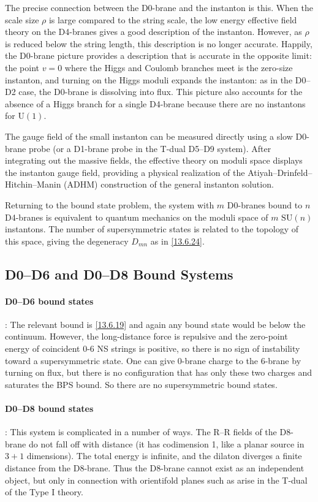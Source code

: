 The precise connection between the D0-brane and the instanton is this. When the scale size $\rho$ is large compared to the string scale, the low energy effective field theory on the D4-branes gives a good description of the instanton. However, as $\rho$ is reduced below the string length, this description is no longer accurate. Happily, the D0-brane picture provides a description that is accurate in the opposite limit: the point $v = 0$ where the Higgs and Coulomb branches meet is the zero-size instanton, and turning on the Higgs moduli expands the instanton: as in the D0--D2 case, the D0-brane is dissolving into flux. This picture also accounts for the absence of a Higgs branch for a single D4-brane because there are no instantons for $\mathrm{U}(1)$.

The gauge field of the small instanton can be measured directly using a slow D0-brane probe (or a D1-brane probe in the T-dual D5--D9 system). After integrating out the massive fields, the effective theory on moduli space displays the instanton gauge field, providing a physical realization of the Atiyah--Drinfeld--Hitchin--Manin (ADHM) construction of the general instanton solution.

Returning to the bound state problem, the system with $m$ D0-branes bound to $n$ D4-branes is equivalent to quantum mechanics on the moduli space of $m$ $\mathrm{SU}(n)$ instantons. The number of supersymmetric states is related to the topology of this space, giving the degeneracy $D_{mn}$ as in \eqref{13.6.24}.

\subsection*{D0--D6 and D0--D8 Bound Systems}

\paragraph*{D0--D6 bound states}:
The relevant bound is \eqref{13.6.19} and again any bound state would be below the continuum. However, the long-distance force is repulsive and the zero-point energy of coincident 0-6 NS strings is positive, so there is no sign of instability toward a supersymmetric state. One can give 0-brane charge to the 6-brane by turning on flux, but there is no configuration that has only these two charges and saturates the BPS bound. So there are no supersymmetric bound states.

\paragraph*{D0--D8 bound states}:
This system is complicated in a number of ways. The R--R fields of the D8-brane do not fall off with distance (it has codimension 1, like a planar source in $3+1$ dimensions). The total energy is infinite, and the dilaton diverges a finite distance from the D8-brane. Thus the D8-brane cannot exist as an independent object, but only in connection with orientifold planes such as arise in the T-dual of the Type I theory.

